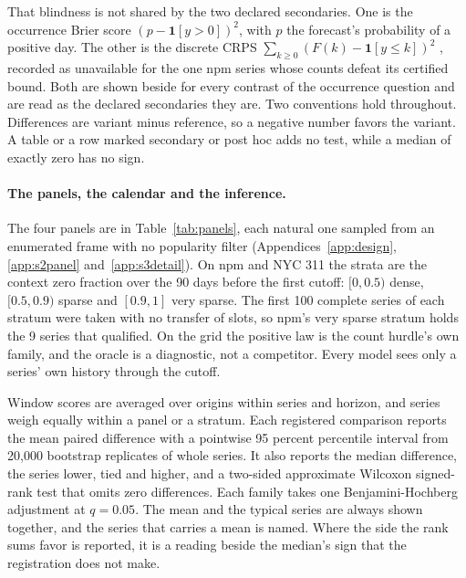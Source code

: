 That blindness is not shared by the two declared secondaries. One is the occurrence Brier score $(p -
\mathbf{1}[y > 0])^2$, with $p$ the forecast's probability of a positive day. The other is the discrete CRPS
$\sum_{k \ge 0} (F(k) - \mathbf{1}[y \le k])^2$ \citep{czado2009}, recorded as unavailable for the one npm
series whose counts defeat its certified bound. Both are shown beside \qs{} for every contrast of the
occurrence question and are read as the declared secondaries they are. Two conventions hold throughout.
Differences are variant minus reference, so a negative number favors the variant. A table or a row marked
secondary or post hoc adds no test, while a median of exactly zero has no sign.

\paragraph{The panels, the calendar and the inference.} The four panels are in Table~\ref{tab:panels}, each
natural one sampled from an enumerated frame with no popularity filter (Appendices~\ref{app:design},
\ref{app:s2panel} and~\ref{app:s3detail}). On npm and NYC 311 the strata are the context zero fraction over
the 90 days before the first cutoff: $[0, 0.5)$ dense, $[0.5, 0.9)$ sparse and $[0.9, 1]$ very sparse. The
first 100 complete series of each stratum were taken with no transfer of slots, so npm's very sparse stratum
holds the 9 series that qualified. On the grid the positive law is the count hurdle's own family, and the
oracle is a diagnostic, not a competitor. Every model sees only a series' own history through the cutoff.

Window scores are averaged over origins within series and horizon, and series weigh equally within a panel or
a stratum. Each registered comparison reports the mean paired difference with a pointwise 95 percent
percentile interval from 20,000 bootstrap replicates of whole series. It also reports the median difference,
the series lower, tied and higher, and a two-sided approximate Wilcoxon signed-rank test that omits zero
differences. Each family takes one Benjamini-Hochberg adjustment at $q = 0.05$. The mean and the typical
series are always shown together, and the series that carries a mean is named. Where the side the rank sums
favor is reported, it is a reading beside the median's sign that the registration does not make.

